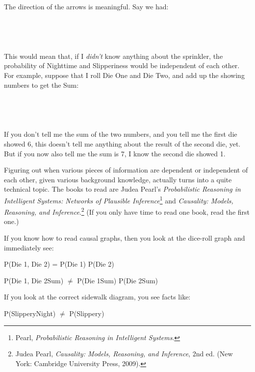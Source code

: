 {
 The direction of the arrows is meaningful. Say we had:}

{
 ~}


{
 ~}

{
 This would mean that, if I \textit{didn't} know
anything about the sprinkler, the probability of Nighttime and
Slipperiness would be independent of each other. For example, suppose
that I roll Die One and Die Two, and add up the showing numbers to get
the Sum:}

{
 ~}



{
 ~}

{
 If you don't tell me the sum of the two numbers,
and you tell me the first die showed 6, this doesn't
tell me anything about the result of the second die, yet. But if you
now also tell me the sum is 7, I know the second die showed 1.}

{
 Figuring out when various pieces of information are dependent or
independent of each other, given various background knowledge, actually
turns into a quite technical topic. The books to read are Judea
Pearl's \textit{Probabilistic Reasoning in Intelligent
Systems: Networks of Plausible Inference}\footnote{Pearl, \textit{Probabilistic Reasoning in Intelligent
Systems}.} and
\textit{Causality: Models, Reasoning, and
Inference}.\footnote{Judea Pearl, \textit{Causality: Models, Reasoning, and
Inference}, 2nd ed. (New York: Cambridge University Press, 2009).} (If you only have time to read one book,
read the first one.)}

{
 If you know how to read causal graphs, then you look at the
dice-roll graph and immediately see:}

{\centering
 P(Die 1, Die 2) = P(Die 1) {\texttimes} P(Die 2)
\par}


\bigskip

{\centering
 P(Die 1, Die 2{\textbar}Sum) ${\neq}$ P(Die 1{\textbar}Sum)
{\texttimes} P(Die 2{\textbar}Sum)
\par}


\bigskip

{
 If you look at the correct sidewalk diagram, you see facts like:}

{\centering
 P(Slippery{\textbar}Night) ${\neq}$ P(Slippery)
\par}


\bigskip

